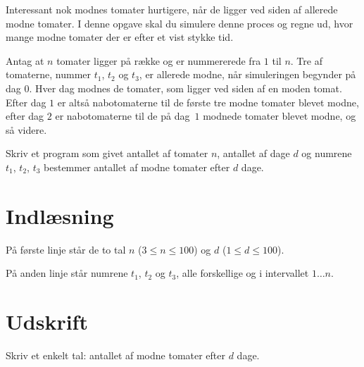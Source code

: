 
Interessant nok modnes tomater hurtigere, når de ligger ved siden af allerede modne tomater.
I denne opgave skal du simulere denne proces og regne ud, hvor mange modne tomater der er efter et vist stykke tid.

Antag at $n$ tomater ligger på række og er nummererede fra $1$ til $n$.
Tre af tomaterne, nummer $t_1$, $t_2$ og $t_3$, er allerede modne, når simuleringen begynder på dag $0$.
Hver dag modnes de tomater, som ligger ved siden af en moden tomat.
Efter dag $1$ er altså nabotomaterne til de første tre modne tomater blevet modne, efter dag $2$ er nabotomaterne til de på dag~$1$ modnede tomater blevet modne, og så videre.

Skriv et program som givet antallet af tomater $n$, antallet af dage $d$ og numrene $t_1$, $t_2$, $t_3$ bestemmer antallet af modne tomater efter $d$ dage.

\section*{Indlæsning}

På første linje står de to tal $n$ ($3 \le n \le 100$) og $d$ ($1 \le d \le 100$).

På anden linje står numrene $t_1$, $t_2$ og $t_3$, alle forskellige og i intervallet $1 \dots n$.

\section*{Udskrift}
Skriv et enkelt tal: antallet af modne tomater efter $d$ dage.
